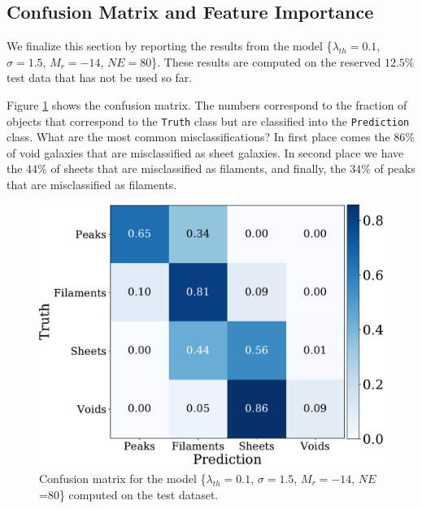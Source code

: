 \documentclass[usenatbib]{mnras}
\begin{document}
\subsection{Confusion Matrix and Feature Importance}

We finalize this section by reporting the results from the model 
\{$\lambda_{th}=0.1$, $\sigma=1.5$, $M_r=-14$, $NE=80$\}.
These results are computed on the reserved $12.5\%$ test data that has not be used so far.

Figure \ref{fig:confusion_matrix} shows the confusion matrix.
The numbers correspond to the fraction of objects that correspond to
the \verb"Truth" class but are classified into the \verb"Prediction"
class.
What are the most common misclassifications?
In first place comes the $86\%$ of void galaxies that are misclassified
as sheet galaxies.  
In second place we have the $44\%$ of sheets that are misclassified
as filaments, and finally, the $34\%$ of peaks that are misclassified as filaments.

\begin{figure}
\centering
    \includegraphics[scale=0.35]{Figs/p_confusion_matrix_test.pdf}
\caption{Confusion matrix for the model 
      \{$\lambda_{th}=0.1$, $\sigma=1.5$, $M_r=-14$,
      $NE$=80\} computed on the test dataset.}
      \label{fig:confusion_matrix}
\end{figure}
\end{document}
